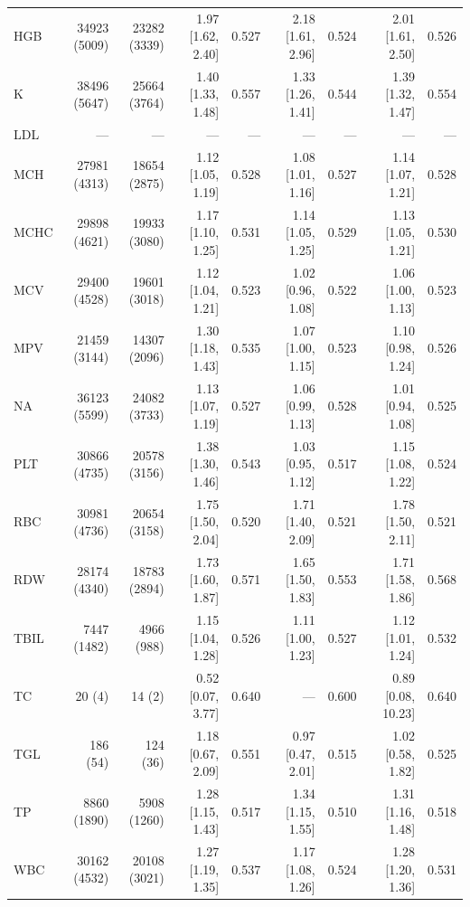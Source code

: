 \begin{table}[ht]
\begin{tabular}{lrrrrrrrr}
HGB & 34923 (5009) & 23282 (3339) & 1.97 [1.62, 2.40] & 0.527 & 2.18 [1.61, 2.96] & 0.524 & 2.01 [1.61, 2.50] & 0.526 \\
K & 38496 (5647) & 25664 (3764) & 1.40 [1.33, 1.48] & 0.557 & 1.33 [1.26, 1.41] & 0.544 & 1.39 [1.32, 1.47] & 0.554 \\
LDL & --- & --- & --- & --- & --- & --- & --- & --- \\
MCH & 27981 (4313) & 18654 (2875) & 1.12 [1.05, 1.19] & 0.528 & 1.08 [1.01, 1.16] & 0.527 & 1.14 [1.07, 1.21] & 0.528 \\
MCHC & 29898 (4621) & 19933 (3080) & 1.17 [1.10, 1.25] & 0.531 & 1.14 [1.05, 1.25] & 0.529 & 1.13 [1.05, 1.21] & 0.530 \\
MCV & 29400 (4528) & 19601 (3018) & 1.12 [1.04, 1.21] & 0.523 & 1.02 [0.96, 1.08] & 0.522 & 1.06 [1.00, 1.13] & 0.523 \\
MPV & 21459 (3144) & 14307 (2096) & 1.30 [1.18, 1.43] & 0.535 & 1.07 [1.00, 1.15] & 0.523 & 1.10 [0.98, 1.24] & 0.526 \\
NA & 36123 (5599) & 24082 (3733) & 1.13 [1.07, 1.19] & 0.527 & 1.06 [0.99, 1.13] & 0.528 & 1.01 [0.94, 1.08] & 0.525 \\
PLT & 30866 (4735) & 20578 (3156) & 1.38 [1.30, 1.46] & 0.543 & 1.03 [0.95, 1.12] & 0.517 & 1.15 [1.08, 1.22] & 0.524 \\
RBC & 30981 (4736) & 20654 (3158) & 1.75 [1.50, 2.04] & 0.520 & 1.71 [1.40, 2.09] & 0.521 & 1.78 [1.50, 2.11] & 0.521 \\
RDW & 28174 (4340) & 18783 (2894) & 1.73 [1.60, 1.87] & 0.571 & 1.65 [1.50, 1.83] & 0.553 & 1.71 [1.58, 1.86] & 0.568 \\
TBIL & 7447 (1482) & 4966 (988) & 1.15 [1.04, 1.28] & 0.526 & 1.11 [1.00, 1.23] & 0.527 & 1.12 [1.01, 1.24] & 0.532 \\
TC & 20 (4) & 14 (2) & 0.52 [0.07, 3.77] & 0.640 & --- & 0.600 & 0.89 [0.08, 10.23] & 0.640 \\
TGL & 186 (54) & 124 (36) & 1.18 [0.67, 2.09] & 0.551 & 0.97 [0.47, 2.01] & 0.515 & 1.02 [0.58, 1.82] & 0.525 \\
TP & 8860 (1890) & 5908 (1260) & 1.28 [1.15, 1.43] & 0.517 & 1.34 [1.15, 1.55] & 0.510 & 1.31 [1.16, 1.48] & 0.518 \\
WBC & 30162 (4532) & 20108 (3021) & 1.27 [1.19, 1.35] & 0.537 & 1.17 [1.08, 1.26] & 0.524 & 1.28 [1.20, 1.36] & 0.531 \\
\bottomrule
\end{tabular}
\label{tab:eicu_cox_aki}
\end{table}